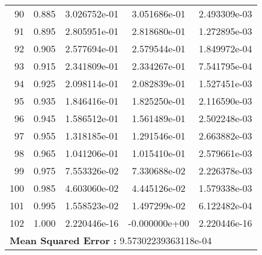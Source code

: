 \begin{table}[ht]
\begin{tabular}{rcccc}
    90 &  0.885 &    3.026752e-01 &    3.051686e-01  &     2.493309e-03\\ 
    91 &  0.895 &    2.805951e-01 &    2.818680e-01  &     1.272895e-03\\ 
    92 &  0.905 &    2.577694e-01 &    2.579544e-01  &     1.849972e-04\\ 
    93 &  0.915 &    2.341809e-01 &    2.334267e-01  &     7.541795e-04\\ 
    94 &  0.925 &    2.098114e-01 &    2.082839e-01  &     1.527451e-03\\ 
    95 &  0.935 &    1.846416e-01 &    1.825250e-01  &     2.116590e-03\\ 
    96 &  0.945 &    1.586512e-01 &    1.561489e-01  &     2.502248e-03\\ 
    97 &  0.955 &    1.318185e-01 &    1.291546e-01  &     2.663882e-03\\ 
    98 &  0.965 &    1.041206e-01 &    1.015410e-01  &     2.579661e-03\\ 
    99 &  0.975 &    7.553326e-02 &    7.330688e-02  &     2.226378e-03\\ 
    100 &  0.985 &    4.603060e-02 &    4.445126e-02  &     1.579338e-03\\ 
    101 &  0.995 &    1.558523e-02 &    1.497299e-02  &     6.122482e-04\\ 
    102 &  1.000 &    2.220446e-16 &   -0.000000e+00  &     2.220446e-16\\ 
    \hline
     \multicolumn{5}{l}{\textbf{Mean Squared Error :} 9.57302239363118e-04}\\ 
  \end{tabular}
  \label{lbl:tabloExmp4_test}
\end{table}
